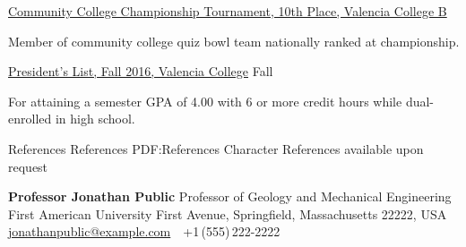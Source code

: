 \documentclass[letterpaper,MMMyyyy,nonstopmode]{simpleresumecv}
\begin{document}
\begin{Body}
\BulletItem
\href{https://www.naqt.com/stats/tournament/standings.jsp?tournament_id=7403}
{Community College Championship Tournament,
10th Place,
Valencia College B}
\hfill
{}
\begin{Detail}
\Item
Member of community college quiz bowl team nationally ranked at championship.
\end{Detail}


\BulletItem
\href{https://valenciacollege.edu/students/deanslist/fall2016.cfm}
	{President's List,
Fall 2016,
Valencia College}
\hfill
Fall  %
\begin{Detail}
\Item
For attaining a semester GPA of 4.00 with 6 or more credit hours while dual-enrolled in high school.
\end{Detail}
\iffalse
    \Section
    {Languages}
    {Languages}
    {PDF:Languages}
    
    
    \BulletItem
    C++
    \begin{Detail}
    \SubBulletItem
    Experience with Pointers, Objects, and Classes. Worked on projects with single and doubly Linked List classes. 
    \end{Detail}
    
\fi





\iffalse
    \Section
    {References}
    {References}
    {PDF:References}
    \Entry
    Character References available upon request

	\BulletItem
	\textbf{Professor Jonathan Public}
	\newline
	Professor of Geology and Mechanical Engineering
	\newline
	First American University
	 First Avenue, Springfield, Massachusetts 22222, USA
	\newline
	\href{mailto:jonathanpublic@example.com}
	{jonathanpublic@example.com}
	\,\SubBulletSymbol\,
	+1\,(555)\,222-2222
	

\end{Body}
\end{document}
